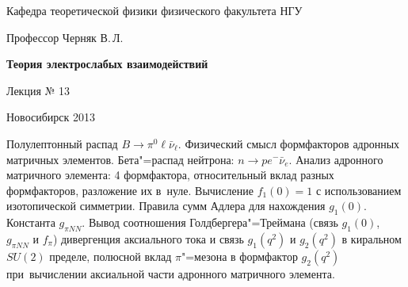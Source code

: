 \documentclass[12pt,pagesize,paper=192mm:108mm]{scrbook}
\begin{document}
\begin{titlepage}
\begin{center}
    Кафедра теоретической физики физического факультета НГУ
    \medskip

    \Large
    Профессор Черняк В.\,Л.
    \bigskip

    \huge
    \textbf{Теория электрослабых взаимодействий}
    \bigskip

    \Large
    Лекция № 13
    \vfill

\normalsize    Новосибирск 2013
  \smallskip

  \ccbysa
  \end{center}
\end{titlepage}
\newpage

\vspace*{-1em}
\begin{center}
 \vfill
  \begin{minipage}{0.66\linewidth}
    Полулептонный распад $B\to\pi^0\ell\bar{\nu}_{\ell}$.  Физический
    смысл формфакторов адронных матричных элементов. Бета"=распад
    нейтрона: $n\to p e^-\bar{\nu}_e$.  Анализ адронного матричного
    элемента: 4 формфактора, относительный вклад разных формфакторов,
    разложение их в~нуле.  Вычисление $f_1(0)=1$ с использованием
    изотопической симметрии.  Правила сумм Адлера для нахождения
    $g_1(0)$. Константа $g_{\pi NN}$.  Вывод соотношения
    Голдбергера"=Треймана (связь $g_1(0)$, $g_{\pi NN}$ и $f_{\pi}$)
    дивергенция аксиального тока и связь $g_1(q^2)$ и $g_2(q^2)$ в
    киральном $SU(2)$ пределе, полюсной вклад $\pi$"=мезона в
    формфактор $g_2(q^2)$ при~вычислении аксиальной части адронного
    матричного элемента.
  \end{minipage}
  \vfill

\end{center}
\end{document}
